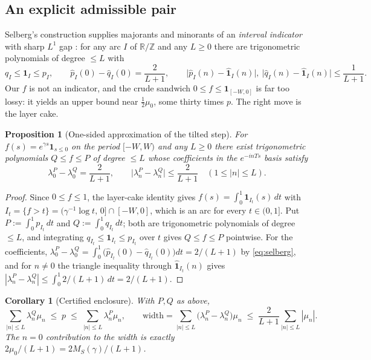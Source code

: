 \documentclass[11pt]{article}
\newtheorem{proposition}{Proposition}
\newtheorem{corollary}{Corollary}
\begin{document}
\subsection{An explicit admissible pair}

Selberg's construction supplies majorants and minorants of an \emph{interval indicator} with sharp
$L^1$ gap \citep{vaaler1985,montgomery1994}: for any arc $I$ of $\mathbb R/\mathbb Z$ and any
$L\ge0$ there are trigonometric polynomials of degree $\le L$ with
\begin{equation}
  \label{eq:selberg}
  q_I\le\mathbf 1_I\le p_I,\qquad
  \hat p_I(0)-\hat q_I(0)=\frac{2}{L+1},\qquad
  \big|\hat p_I(n)-\hat{\mathbf 1}_I(n)\big|,\ \big|\hat q_I(n)-\hat{\mathbf 1}_I(n)\big|\le\frac1{L+1}.
\end{equation}
Our $f$ is not an indicator, and the crude sandwich $0\le f\le\mathbf 1_{[-W,0]}$ is far too lossy:
it yields an upper bound near $\tfrac12\mu_0$, some thirty times $p$. The right move is the layer
cake.

\begin{proposition}[One-sided approximation of the tilted step]
\label{prop:layercake}
For $f(s)=e^{\gamma s}\mathbf 1_{s\le0}$ on the period $[-W,W)$ and any $L\ge0$ there exist
trigonometric polynomials $Q\le f\le P$ of degree $\le L$ whose coefficients in the $e^{-inTs}$
basis satisfy
\[
  \lambda^P_0-\lambda^Q_0=\frac{2}{L+1},
  \qquad
  \big|\lambda^P_n-\lambda^Q_n\big|\le\frac{2}{L+1}\quad(1\le|n|\le L).
\]
\end{proposition}
\begin{proof}
Since $0\le f\le1$, the layer-cake identity gives $f(s)=\int_0^1\mathbf 1_{I_t}(s)\,dt$ with
$I_t=\{f>t\}=(\gamma^{-1}\log t,\,0]\cap[-W,0]$, which is an arc for every $t\in(0,1]$. Put
$P:=\int_0^1 p_{I_t}\,dt$ and $Q:=\int_0^1 q_{I_t}\,dt$; both are trigonometric polynomials of
degree $\le L$, and integrating $q_{I_t}\le\mathbf 1_{I_t}\le p_{I_t}$ over $t$ gives $Q\le f\le P$
pointwise. For the coefficients,
$\lambda^P_0-\lambda^Q_0=\int_0^1\big(\hat p_{I_t}(0)-\hat q_{I_t}(0)\big)dt=2/(L+1)$
by \eqref{eq:selberg}, and for $n\ne0$ the triangle inequality through $\hat{\mathbf 1}_{I_t}(n)$
gives $|\lambda^P_n-\lambda^Q_n|\le\int_0^1 2/(L+1)\,dt=2/(L+1)$.
\end{proof}

\begin{corollary}[Certified enclosure]
\label{cor:enclosure}
With $P,Q$ as above,
\[
  \sum_{|n|\le L}\lambda^Q_n\mu_n\;\le\;p\;\le\;\sum_{|n|\le L}\lambda^P_n\mu_n,
  \qquad
  \mathrm{width}=\sum_{|n|\le L}\big(\lambda^P_n-\lambda^Q_n\big)\mu_n
  \;\le\;\frac{2}{L+1}\sum_{|n|\le L}|\mu_n| .
\]
The $n=0$ contribution to the width is exactly $2\mu_0/(L+1)=2M_S(\gamma)/(L+1)$.
\end{corollary}
\end{document}
